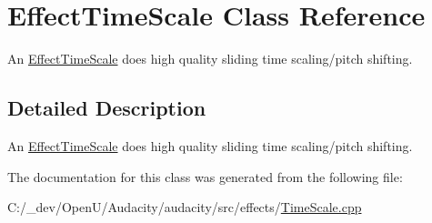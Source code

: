 \hypertarget{class_effect_time_scale}{}\section{Effect\+Time\+Scale Class Reference}
\label{class_effect_time_scale}


An \hyperlink{class_effect_time_scale}{Effect\+Time\+Scale} does high quality sliding time scaling/pitch shifting.  




\subsection{Detailed Description}
An \hyperlink{class_effect_time_scale}{Effect\+Time\+Scale} does high quality sliding time scaling/pitch shifting. 

The documentation for this class was generated from the following file\+:\begin{DoxyCompactItemize}
\item 
C\+:/\+\_\+dev/\+Open\+U/\+Audacity/audacity/src/effects/\hyperlink{_time_scale_8cpp}{Time\+Scale.\+cpp}\end{DoxyCompactItemize}
